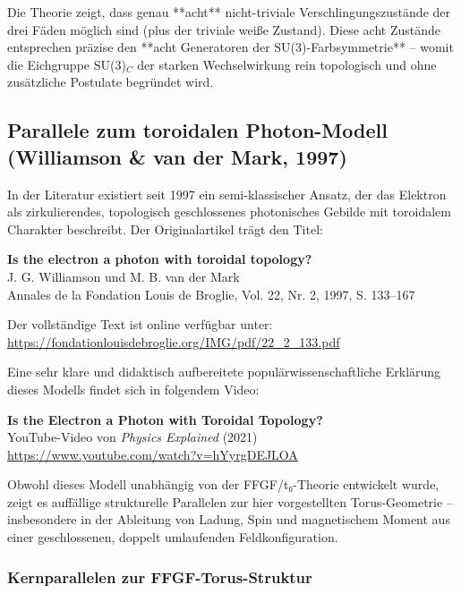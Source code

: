 	Die Theorie zeigt, dass genau **acht** nicht-triviale Verschlingungszustände der drei Fäden möglich sind (plus der triviale weiße Zustand). Diese acht Zustände entsprechen präzise den **acht Generatoren der SU(3)-Farbsymmetrie** – womit die Eichgruppe SU(3)$_C$ der starken Wechselwirkung rein topologisch und ohne zusätzliche Postulate begründet wird.
	
	\subsection{Parallele zum toroidalen Photon-Modell (Williamson \& van der Mark, 1997)}
	
	In der Literatur existiert seit 1997 ein semi-klassischer Ansatz, der das Elektron als zirkulierendes, topologisch geschlossenes photonisches Gebilde mit toroidalem Charakter beschreibt. Der Originalartikel trägt den Titel:
	
	\begin{center}
		\textbf{Is the electron a photon with toroidal topology?} \\
		J. G. Williamson und M. B. van der Mark \\
		Annales de la Fondation Louis de Broglie, Vol. 22, Nr. 2, 1997, S. 133--167
	\end{center}
	
	Der vollständige Text ist online verfügbar unter: \\
	\url{https://fondationlouisdebroglie.org/IMG/pdf/22_2_133.pdf}
	
	Eine sehr klare und didaktisch aufbereitete populärwissenschaftliche Erklärung dieses Modells findet sich in folgendem Video:
	
	\begin{center}
		\textbf{Is the Electron a Photon with Toroidal Topology?} \\
		YouTube-Video von \emph{Physics Explained} (2021) \\
		\url{https://www.youtube.com/watch?v=hYyrgDEJLOA}
	\end{center}
	
	Obwohl dieses Modell unabhängig von der FFGF/t₀-Theorie entwickelt wurde, zeigt es auffällige strukturelle Parallelen zur hier vorgestellten Torus-Geometrie – insbesondere in der Ableitung von Ladung, Spin und magnetischem Moment aus einer geschlossenen, doppelt umlaufenden Feldkonfiguration.
	
	\subsubsection{Kernparallelen zur FFGF-Torus-Struktur}
	
